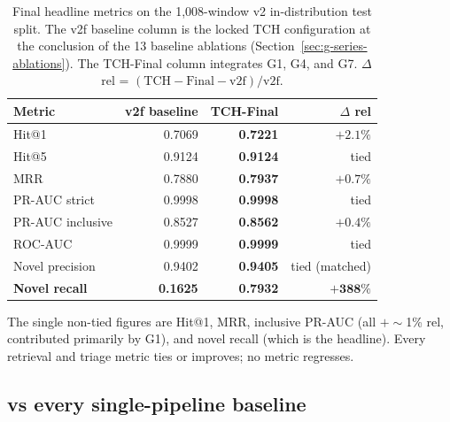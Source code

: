 \begin{table}[h]
\centering
\caption{Final headline metrics on the 1{,}008-window v2 in-distribution test split. The v2f baseline column is the locked TCH configuration at the conclusion of the 13 baseline ablations (Section~\ref{sec:g-series-ablations}). The TCH-Final column integrates G1, G4, and G7. $\Delta$ rel = $(\mathrm{TCH-Final} - \mathrm{v2f}) / \mathrm{v2f}$.}
\label{tab:headline}
\small
\begin{tabular}{lrrr}
\toprule
Metric & v2f baseline & \textbf{TCH-Final} & $\Delta$ rel \\
\midrule
Hit@1                & 0.7069 & \textbf{0.7221} & $+2.1\%$ \\
Hit@5                & 0.9124 & \textbf{0.9124} & tied \\
MRR                  & 0.7880 & \textbf{0.7937} & $+0.7\%$ \\
PR-AUC strict        & 0.9998 & \textbf{0.9998} & tied \\
PR-AUC inclusive     & 0.8527 & \textbf{0.8562} & $+0.4\%$ \\
ROC-AUC              & 0.9999 & \textbf{0.9999} & tied \\
Novel precision      & 0.9402 & \textbf{0.9405} & tied (matched) \\
\textbf{Novel recall} & \textbf{0.1625} & \textbf{0.7932} & $\boldsymbol{+388\%}$ \\
\bottomrule
\end{tabular}
\end{table}

The single non-tied figures are Hit@1, MRR, inclusive PR-AUC (all $+\sim$1\% rel, contributed primarily by G1), and novel recall (which is the headline). Every retrieval and triage metric ties or improves; no metric regresses.

\subsection{\tch{} vs every single-pipeline baseline}

